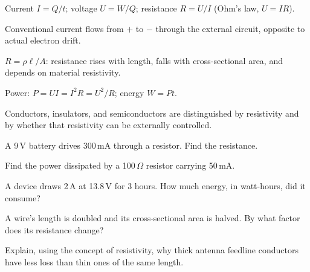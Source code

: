 \begin{quickreview}
\item Current $I = Q/t$; voltage $U = W/Q$; resistance $R = U/I$ (Ohm's
law, $U = IR$).
\item Conventional current flows from $+$ to $-$ through the external
circuit, opposite to actual electron drift.
\item $R = \rho \ell / A$: resistance rises with length, falls with
cross-sectional area, and depends on material resistivity.
\item Power: $P = UI = I^2R = U^2/R$; energy $W = Pt$.
\item Conductors, insulators, and semiconductors are distinguished by
resistivity and by whether that resistivity can be externally controlled.
\end{quickreview}

\begin{practiceproblems}
\item A 9\,V battery drives 300\,mA through a resistor. Find the
resistance.
\item Find the power dissipated by a 100\,$\Omega$ resistor carrying
50\,mA.
\item A device draws 2\,A at 13.8\,V for 3 hours. How much energy, in
watt-hours, did it consume?
\item A wire's length is doubled and its cross-sectional area is halved.
By what factor does its resistance change?
\item Explain, using the concept of resistivity, why thick antenna
feedline conductors have less loss than thin ones of the same length.
\end{practiceproblems}
